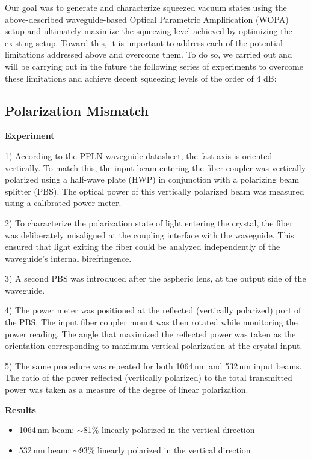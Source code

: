 \documentclass[colorlinks=true,pdfstartview=FitV,linkcolor=blue,
citecolor=red,urlcolor=magenta]{ligodoc}
\begin{document}
Our goal was to generate and characterize squeezed vacuum states using the above-described waveguide-based Optical Parametric Amplification (WOPA) setup and ultimately maximize the squeezing level achieved by optimizing the existing setup. Toward this, it is important to address each of the potential limitations addressed above and overcome them. To do so, we carried out and will be carrying out in the future the following series of experiments to overcome these limitations and achieve decent squeezing levels of the order of 4 dB:

\subsection{Polarization Mismatch }

\textbf{Experiment}

1) According to the PPLN waveguide datasheet, the fast axis is oriented vertically. To match this, the input beam entering the fiber coupler was vertically polarized using a half-wave plate (HWP) in conjunction with a polarizing beam splitter (PBS). The optical power of this vertically polarized beam was measured using a calibrated power meter.

2) To characterize the polarization state of light entering the crystal, the fiber was deliberately misaligned at the coupling interface with the waveguide. This ensured that light exiting the fiber could be analyzed independently of the waveguide's internal birefringence.

3) A second PBS was introduced after the aspheric lens, at the output side of the waveguide.

4) The power meter was positioned at the reflected (vertically polarized) port of the PBS. The input fiber coupler mount was then rotated while monitoring the power reading. The angle that maximized the reflected power was taken as the orientation corresponding to maximum vertical polarization at the crystal input.

5) The same procedure was repeated for both 1064\,nm and 532\,nm input beams. The ratio of the power reflected (vertically polarized) to the total transmitted power was taken as a measure of the degree of linear polarization.

\textbf{Results}

\begin{itemize}
    \item 1064\,nm beam: $\sim$81\% linearly polarized in the vertical direction
    \item 532\,nm beam: $\sim$93\% linearly polarized in the vertical direction
\end{itemize}
\end{document}
